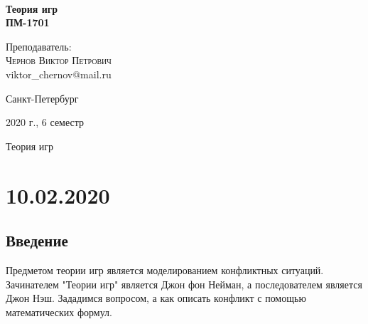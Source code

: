 \documentclass[aps,%
12pt,%
final,%
oneside,
onecolumn,%
musixtex, %
superscriptaddress,%
centertags]{article} %
\begin{document}
\begin{titlepage} 
\begin{center}
 
\textbf{}\\[10.0cm]
\textbf{\LARGE Теория игр}\\[0.5cm]
\textbf{\Large ПМ-1701} \\[0.1cm]

\begin{center} \large
{Преподаватель:} \\[0.5cm]
\textsc {Чернов Виктор Петрович}\\
{viktor\_chernov@mail.ru}\\
\end{center}
\vfill 

{\large {Санкт-Петербург}} \par
{\large {2020 г., 6 семестр}}
\end{center} 
\end{titlepage}

\begin{thebibliography}{3}
Теория игр
\end{thebibliography}
\tableofcontents
\newpage

\section{10.02.2020}
\subsection{Введение}

Предметом теории игр является моделированием конфликтных ситуаций. Зачинателем "Теории игр" является Джон фон Нейман, а последователем является Джон Нэш. Зададимся вопросом, а как описать конфликт с помощью математических формул. 
\end{document}
